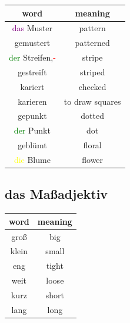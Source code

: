 \begin{center}
    \begin{tabular} {|c|c|}
        \hline
        \rowcolor{gray}
        word                                               & meaning         \\
        \hline
        \textcolor{purple}{das} Muster                     & pattern         \\
        gemustert                                          & patterned       \\
        \hline
        \textcolor{green}{der} Streifen,\textcolor{red}{-} & stripe          \\
        gestreift                                          & striped         \\
        \hline
        kariert                                            & checked         \\
        karieren                                           & to draw squares \\
        \hline
        gepunkt                                            & dotted          \\
        \textcolor{green}{der} Punkt                       & dot             \\
        \hline
        geblümt                                            & floral          \\
        \textcolor{yellow}{die} Blume                      & flower          \\
        \hline
    \end{tabular}
\end{center}

\subsection{das Maßadjektiv}

\begin{center}
    \begin{tabular} {|c|c|}
        \hline
        \rowcolor{gray}
        word  & meaning \\
        \hline
        groß  & big     \\
        klein & small   \\
        eng   & tight   \\
        weit  & loose   \\
        kurz  & short   \\
        lang  & long    \\
        \hline
    \end{tabular}
\end{center}

